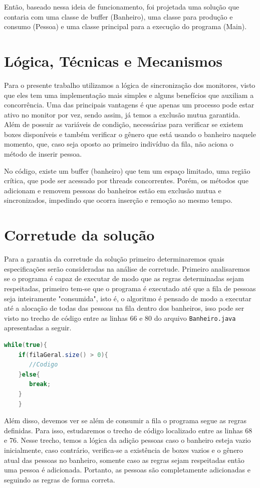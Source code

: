 \documentclass[review]{elsarticle}
\begin{document}
Então, baseado nessa ideia de funcionamento, foi projetada uma solução que contaria com uma classe de buffer (Banheiro), uma classe para produção e consumo (Pessoa) e uma classe principal para a execução do programa (Main).

\section{Lógica, Técnicas e Mecanismos}

Para o presente trabalho utilizamos a lógica de sincronização dos monitores, visto que eles tem uma implementação mais simples e alguns benefícios que auxiliam a concorrência. Uma das principais vantagens é que apenas um processo pode estar ativo no monitor por vez, sendo assim, já temos a exclusão mutua garantida. Além de possuir as variáveis de condição, necessárias para verificar se existem boxes disponíveis e também verificar o gênero que está usando o banheiro naquele momento, que,  caso seja oposto ao primeiro indivíduo da fila, não aciona o método de inserir pessoa.

No código, existe um buffer (banheiro) que tem um espaço limitado, uma região crítica, que pode ser acessado  por threads concorrentes. Porém, os métodos que adicionam e removem pessoas do banheiros estão em exclusão mutua e sincronizados, impedindo que ocorra inserção e remoção ao mesmo tempo. 
 
\section{Corretude da solução}

Para a garantia da corretude da solução primeiro determinaremos quais especificações serão consideradas na análise de corretude. Primeiro analisaremos se o programa é capaz de executar de modo que as regras determinadas sejam respeitadas, primeiro tem-se que o programa é executado até que a fila de pessoas seja inteiramente "consumida", isto é, o algoritmo é pensado de modo a executar até a alocação de todas das pessoas na fila dentro dos banheiros, isso pode ser visto no trecho de código entre as linhas 66 e 80 do arquivo \verb|Banheiro.java| apresentadas a seguir.

\begin{lstlisting}[language=Java]
    while(true){
	if(filaGeral.size() > 0){
	   //Codigo
	}else{
	   break;
	}
    }
\end{lstlisting}

Além disso, devemos ver se além de consumir a fila o programa segue as regras definidas. Para isso, estudaremos o trecho de código localizado entre as linhas 68 e 76. Nesse trecho, temos a lógica da adição pessoas caso o banheiro esteja vazio inicialmente, caso contrário, verifica-se a existência de boxes vazios e o gênero atual das pessoas no banheiro, somente caso as regras sejam respeitadas então uma pessoa é adicionada. Portanto, as pessoas são completamente adicionadas e seguindo as regras de forma correta.
\end{document}
